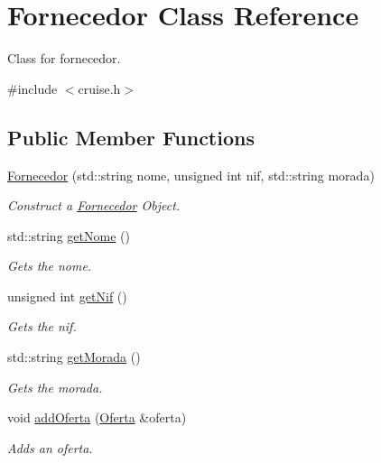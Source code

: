 \hypertarget{classFornecedor}{}\section{Fornecedor Class Reference}
\label{classFornecedor}


Class for fornecedor.  




{\ttfamily \#include $<$cruise.\+h$>$}

\subsection*{Public Member Functions}
\begin{DoxyCompactItemize}
\item 
\hyperlink{classFornecedor_a0cbc4556289cc946756039ab0da52756}{Fornecedor} (std\+::string nome, unsigned int nif, std\+::string morada)
\begin{DoxyCompactList}\small\item\em Construct a \hyperlink{classFornecedor}{Fornecedor} Object. \end{DoxyCompactList}\item 
std\+::string \hyperlink{classFornecedor_a8d14dd862259e29adef0e283f15cbb16}{get\+Nome} ()
\begin{DoxyCompactList}\small\item\em Gets the nome. \end{DoxyCompactList}\item 
unsigned int \hyperlink{classFornecedor_aec536b071f628fc1aa468071fa5a6067}{get\+Nif} ()
\begin{DoxyCompactList}\small\item\em Gets the nif. \end{DoxyCompactList}\item 
std\+::string \hyperlink{classFornecedor_ae71fba3a196f749f54956fdbb25ede6a}{get\+Morada} ()
\begin{DoxyCompactList}\small\item\em Gets the morada. \end{DoxyCompactList}\item 
void \hyperlink{classFornecedor_a220373fd19f44a30d7c6c1ec913be700}{add\+Oferta} (\hyperlink{classOferta}{Oferta} \&oferta)
\begin{DoxyCompactList}\small\item\em Adds an oferta. \end{DoxyCompactList}\item 

\end{DoxyCompactItemize}
